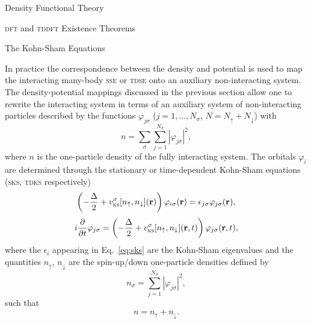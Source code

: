 \documentclass[letterpaper, 11 pt]{report}
\begin{document}
\begin{chapter}{Density Functional Theory \label{chap:dft}}
\begin{section}{\textsc{dft} and \textsc{tddft} Existence Theorems \label{sec:dft}}
   \end{section}

   \begin{section}{The Kohn-Sham Equations \label{sec:ks}}

      In practice the correspondence between the density and potential is used to map the interacting
      many-body \textsc{sse} or \textsc{tdse} onto an auxiliary non-interacting system. The
      density-potential mappings discussed in the previous section allow one to rewrite the interacting
      system in terms of an auxiliary system of non-interacting particles described by the functions
      $\varphi_{j\sigma}$ ($j = 1, \dots, N_\sigma$, $N = N_\uparrow + N_\downarrow$) with
      \begin{equation} \label{eq:dendef2}
         n = \sum\limits_{\sigma} \sum\limits_{j = 1}^{N_\sigma}
                           \left| \varphi_{j\sigma} \right|^2,
      \end{equation}
      where $n$ is the one-particle density of the fully interacting system. The orbitals $\varphi_i$
      are determined through the stationary or time-dependent Kohn-Sham equations~\cite{ks-eq,
      spin-dep1, spin-dep3} (\textsc{sks}, \textsc{tdks} respectively)
      \begin{equation} \label{eq:sks}
         \left( -\frac{\Delta}{2} + v^\sigma_\mathrm{\textsc{ks}}[n_\uparrow,
         n_\downarrow](\mathbf{r}) \right)
          \varphi_{i\sigma}(\mathbf{r}) = \epsilon_{j \sigma} \varphi_{j \sigma}(\mathbf{r}),
      \end{equation}
      \begin{equation} \label{eq:tdks}
         i \frac{\partial}{\partial t} \varphi_{j\sigma} = 
            \left( -\frac{\Delta}{2} +
            v^\sigma_\mathrm{\textsc{ks}}[n_\uparrow, n_\downarrow](\mathbf{r},t)
            \right) \varphi_{j\sigma}(\mathbf{r},t),
      \end{equation}
      where the $\epsilon_i$ appearing in Eq.~\eqref{eq:sks} are the Kohn-Sham eigenvalues and the
      quantities $n_\uparrow$, $n_\downarrow$ are the spin-up/down one-particle densities defined by
      \begin{equation} \label{eq:spinden}
         n_\sigma = \sum\limits_{j=1}^{N_\sigma} \left| \varphi_{j\sigma} \right|^2,
      \end{equation}
      such that
      \begin{equation} \label{eq:denconstraint}
         n = n_\uparrow + n_\downarrow.
      \end{equation}


\end{section}
\end{chapter}
\end{document}
